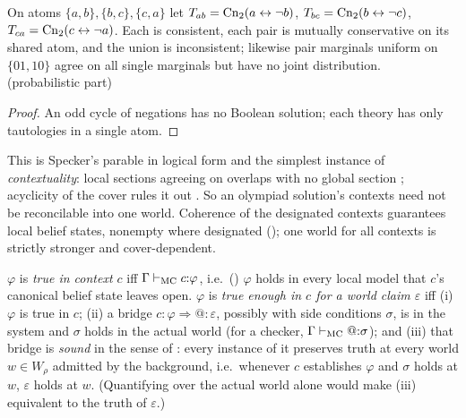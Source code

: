 \begin{proposition}\label{prop:existence:triangle}
On atoms $\{a,b\},\{b,c\},\{c,a\}$ let $T_{ab}=\mathrm{Cn}_2(a\leftrightarrow\neg b)$, $T_{bc}=\mathrm{Cn}_2(b\leftrightarrow\neg c)$, $T_{ca}=\mathrm{Cn}_2(c\leftrightarrow\neg a)$. Each is consistent, each pair is mutually conservative on its shared atom, and the union is inconsistent; likewise pair marginals uniform on $\{01,10\}$ agree on all single marginals but have no joint distribution.
\hfill{}\,(probabilistic part)
\end{proposition}

\begin{proof}
An odd cycle of negations has no Boolean solution; each theory has only tautologies in a single atom.
\end{proof}

This is Specker's parable in logical form \citep{specker1960logik} and the simplest instance of \emph{contextuality}: local sections agreeing on overlaps with no global section \citep{abramsky2011sheaf}; acyclicity of the cover rules it out \citep{beeri1983desirability}. So an olympiad solution's contexts need not be reconcilable into one world. Coherence of the designated contexts guarantees local belief states, nonempty where designated (); one world for all contexts is strictly stronger and cover-dependent.

\begin{definition}\label{def:existence:truecontext}
$\varphi$ is \emph{true in context $c$} iff $\Gamma\vdash_{\mathrm{MC}}c{:}\varphi$, i.e.\ () $\varphi$ holds in every local model that $c$'s canonical belief state leaves open. $\varphi$ is \emph{true enough in $c$ for a world claim $\varepsilon$} iff (i) $\varphi$ is true in $c$; (ii) a bridge $c{:}\varphi\Rightarrow@{:}\varepsilon$, possibly with side conditions $\sigma$, is in the system and $\sigma$ holds in the actual world (for a checker, $\Gamma\vdash_{\mathrm{MC}}@{:}\sigma$); and (iii) that bridge is \emph{sound} in the sense of : every instance of it preserves truth at every world $w\in W_\rho$ admitted by the background, i.e.\ whenever $c$ establishes $\varphi$ and $\sigma$ holds at $w$, $\varepsilon$ holds at $w$. (Quantifying over the actual world alone would make (iii) equivalent to the truth of $\varepsilon$.)
\end{definition}

